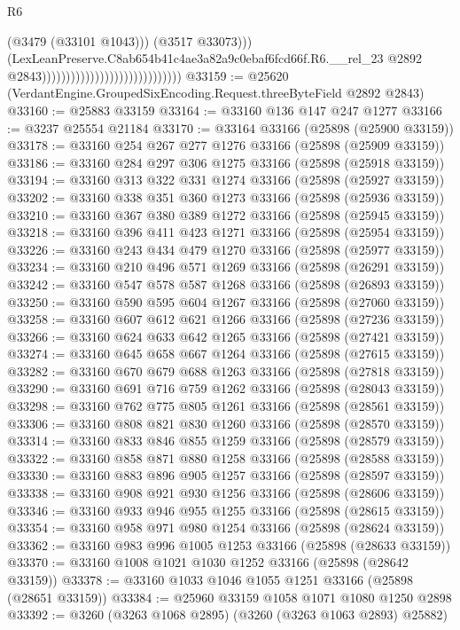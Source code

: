 \begin{lexlean}{R6}
\begin{coremodule}
                                                                  (@3479 (@33101 @1043)))
                                                                (@3517 @33073)))
                                                            (LexLeanPreserve.C8ab654b41c4ae3a82a9c0ebaf6fcd66f.R6.__rel_23
                                                              @2892
                                                              @2843)))))))))))))))))))))))))))))
@33159 := @25620 (VerdantEngine.GroupedSixEncoding.Request.threeByteField @2892 @2843)
@33160 := @25883 @33159
@33164 := @33160 @136 @147 @247 @1277
@33166 := @3237 @25554 @21184
@33170 := @33164 @33166 (@25898 (@25900 @33159))
@33178 := @33160 @254 @267 @277 @1276 @33166 (@25898 (@25909 @33159))
@33186 := @33160 @284 @297 @306 @1275 @33166 (@25898 (@25918 @33159))
@33194 := @33160 @313 @322 @331 @1274 @33166 (@25898 (@25927 @33159))
@33202 := @33160 @338 @351 @360 @1273 @33166 (@25898 (@25936 @33159))
@33210 := @33160 @367 @380 @389 @1272 @33166 (@25898 (@25945 @33159))
@33218 := @33160 @396 @411 @423 @1271 @33166 (@25898 (@25954 @33159))
@33226 := @33160 @243 @434 @479 @1270 @33166 (@25898 (@25977 @33159))
@33234 := @33160 @210 @496 @571 @1269 @33166 (@25898 (@26291 @33159))
@33242 := @33160 @547 @578 @587 @1268 @33166 (@25898 (@26893 @33159))
@33250 := @33160 @590 @595 @604 @1267 @33166 (@25898 (@27060 @33159))
@33258 := @33160 @607 @612 @621 @1266 @33166 (@25898 (@27236 @33159))
@33266 := @33160 @624 @633 @642 @1265 @33166 (@25898 (@27421 @33159))
@33274 := @33160 @645 @658 @667 @1264 @33166 (@25898 (@27615 @33159))
@33282 := @33160 @670 @679 @688 @1263 @33166 (@25898 (@27818 @33159))
@33290 := @33160 @691 @716 @759 @1262 @33166 (@25898 (@28043 @33159))
@33298 := @33160 @762 @775 @805 @1261 @33166 (@25898 (@28561 @33159))
@33306 := @33160 @808 @821 @830 @1260 @33166 (@25898 (@28570 @33159))
@33314 := @33160 @833 @846 @855 @1259 @33166 (@25898 (@28579 @33159))
@33322 := @33160 @858 @871 @880 @1258 @33166 (@25898 (@28588 @33159))
@33330 := @33160 @883 @896 @905 @1257 @33166 (@25898 (@28597 @33159))
@33338 := @33160 @908 @921 @930 @1256 @33166 (@25898 (@28606 @33159))
@33346 := @33160 @933 @946 @955 @1255 @33166 (@25898 (@28615 @33159))
@33354 := @33160 @958 @971 @980 @1254 @33166 (@25898 (@28624 @33159))
@33362 := @33160 @983 @996 @1005 @1253 @33166 (@25898 (@28633 @33159))
@33370 := @33160 @1008 @1021 @1030 @1252 @33166 (@25898 (@28642 @33159))
@33378 := @33160 @1033 @1046 @1055 @1251 @33166 (@25898 (@28651 @33159))
@33384 := @25960 @33159 @1058 @1071 @1080 @1250 @2898
@33392 := @3260 (@3263 @1068 @2895) (@3260 (@3263 @1063 @2893) @25882)

\end{coremodule}
\end{lexlean}
